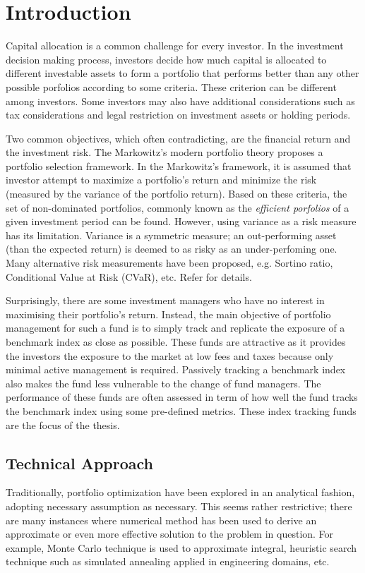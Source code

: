 \chapter{Introduction}
\graphicspath{{Chapter1/figures/}}
\label{Introduction}
Capital allocation is a common challenge for every investor. In the investment decision making process, investors decide how much capital is allocated to different investable assets to form a portfolio that performs better than any other possible porfolios according to some criteria. These criterion can be different among investors. Some investors may also have additional considerations such as tax considerations and legal restriction on investment assets or holding periods.

Two common objectives, which often contradicting, are the financial return and the investment risk. The Markowitz's modern portfolio theory \cite{HM52} proposes a portfolio selection framework. In the Markowitz's framework, it is assumed that investor attempt to maximize a portfolio's return and minimize the risk (measured by the variance of the portfolio return). Based on these criteria, the set of non-dominated portfolios, commonly known as the \emph{efficient porfolios} of a given investment period can be found. However, using variance as a risk measure has its limitation. Variance is a symmetric measure; an out-performing asset (than the expected return) is deemed to as risky as an under-perfoming one. Many alternative risk measurements have been proposed, e.g. Sortino ratio, Conditional Value at Risk (CVaR), etc. Refer \cite{RTR00} for details.

Surprisingly, there are some investment managers who have no interest in maximising their portfolio's return. Instead, the main objective of portfolio management for such a fund is to simply track and replicate the exposure of a benchmark index as close as possible. These funds are attractive as it provides the investors the exposure to the market at low fees and taxes because only minimal active management is required. Passively tracking a benchmark index also makes the fund less vulnerable to the change of fund managers. The performance of these funds are often assessed in term of how well the fund tracks the benchmark index using some pre-defined metrics. These index tracking funds are the focus of the thesis.

\section{Technical Approach}
Traditionally, portfolio optimization have been explored in an analytical fashion, adopting necessary assumption as necessary. This seems rather restrictive; there are many instances where numerical method has been used to derive an approximate or even more effective solution to the problem in question. For example, Monte Carlo technique is used to approximate integral, heuristic search technique such as simulated annealing applied in engineering domains, etc.

